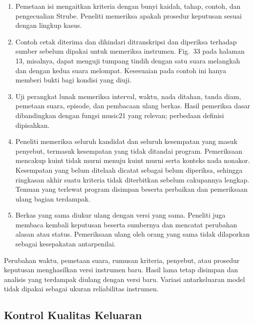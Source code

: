 \begin{enumerate}
    \item Pemetaan isi mengaitkan kriteria dengan bunyi kaidah, tahap, contoh, dan pengecualian Strube. Peneliti memeriksa apakah prosedur keputusan sesuai dengan lingkup kasus.
    \item Contoh cetak diterima dan dihindari ditranskripsi dan diperiksa terhadap sumber sebelum dipakai untuk memeriksa instrumen. Fig.~33 pada halaman 13, misalnya, dapat menguji tumpang tindih dengan satu suara melangkah dan dengan kedua suara melompat. Kesesuaian pada contoh ini hanya memberi bukti bagi kondisi yang diuji.
    \item Uji perangkat lunak memeriksa interval, waktu, nada ditahan, tanda diam, pemetaan suara, episode, dan pembacaan ulang berkas. Hasil pemeriksa dasar dibandingkan dengan fungsi music21 yang relevan; perbedaan definisi dipisahkan.
    \item Peneliti memeriksa seluruh kandidat dan seluruh kesempatan yang masuk penyebut, termasuk kesempatan yang tidak ditandai program. Pemeriksaan mencakup kuint tidak murni menuju kuint murni serta konteks nada nonakor. Kesempatan yang belum ditelaah dicatat sebagai belum diperiksa, sehingga ringkasan akhir suatu kriteria tidak diterbitkan sebelum cakupannya lengkap. Temuan yang terlewat program disimpan beserta perbaikan dan pemeriksaan ulang bagian terdampak.
    \item Berkas yang sama diukur ulang dengan versi yang sama. Peneliti juga membaca kembali keputusan beserta sumbernya dan mencatat perubahan alasan atau status. Pemeriksaan ulang oleh orang yang sama tidak dilaporkan sebagai kesepakatan antarpenilai.
\end{enumerate}

Perubahan waktu, pemetaan suara, rumusan kriteria, penyebut, atau prosedur keputusan menghasilkan versi instrumen baru. Hasil lama tetap disimpan dan analisis yang terdampak diulang dengan versi baru. Variasi antarkeluaran model tidak dipakai sebagai ukuran reliabilitas instrumen.

\subsection{Kontrol Kualitas Keluaran}\label{sec:kontrol-kualitas-sampel}

